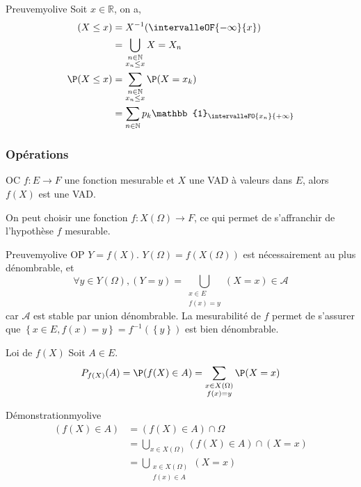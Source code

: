     \begin{demo}{Preuve}{myolive}
        Soit $x \in \mathbb{R}$, on a, 
        \begin{align*}
            (X \leq x) &= X^{-1}(\intervalleOF{-\infty}{x}) \\
            &= \bigcup_{\substack{n \in \mathbb{N} \\ x_n \leq x}} X = X_n \\
            \P(X \leq x) &= \sum_{\substack{n \in \mathbb{N} \\ x_n \leq x}} \P(X = x_k) \\ 
            &= \sum_{n \in \mathbb{N}} p_k \mathbb{1}_{\intervalleFO{x_n}{+\infty}}
        \end{align*}
    \end{demo}

    \subsubsection{Opérations}

    \begin{prop}{}{}
        OC $f : E \to F$ une fonction mesurable et $X$ une VAD à valeurs dans $E$, alors $f(X)$ est une VAD.
    \end{prop}

    On peut choisir une fonction $f : X(\Omega) \to F$, ce qui permet de s’affranchir de l’hypothèse $f$ mesurable.

    \begin{demo}{Preuve}{myolive}
        OP $Y = f(X)$. $Y(\Omega) = f(X(\Omega))$ est nécessairement au plus dénombrable, et 
        \[ \forall y \in Y(\Omega), (Y = y) = \bigcup_{\substack{x \in E \\ f(x) = y}} (X = x) \in \mathcal{A} \]   
        car $\mathcal{A}$ est stable par union dénombrable. La mesurabilité de $f$ permet de s’assurer que $\left\{x \in E, f(x) = y\right\} = f^{-1}(\left\{y\right\})$ est bien dénombrable.
    \end{demo}

    \begin{prop}{Loi de $f(X)$}{}
        Soit $A \in E$.
        \[ P_{f(X)}(A) = \P(f(X) \in A) = \sum_{\substack{x \in X(\Omega) \\ f(x) = y}} \P(X = x) \]   
    \end{prop}

    \begin{demo}{Démonstration}{myolive}
        \begin{align*}
            (f(X) \in A) &= (f(X) \in A) \cap \Omega \\
            &= \bigcup_{x \in X(\Omega)} (f(X) \in A) \cap (X = x) \\
            &= \bigcup_{\substack{x \in X(\Omega) \\ f(x) \in A}} (X = x)
        \end{align*}
    \end{demo}

